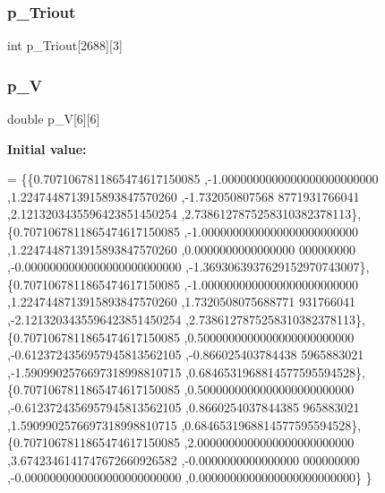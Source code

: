 \mbox{\label{a00449_a18cfd6f50be18d3cfbb0235076b8d729}} 
\subsubsection{\texorpdfstring{p\+\_\+\+Triout}{p\_Triout}}
{\footnotesize\ttfamily int p\+\_\+\+Triout\mbox{[}2688\mbox{]}\mbox{[}3\mbox{]}}

\mbox{\label{a00449_afe4548e68ef5e0d69ce742335c373bc2}} 
\subsubsection{\texorpdfstring{p\+\_\+V}{p\_V}}
{\footnotesize\ttfamily double p\+\_\+V\mbox{[}6\mbox{]}\mbox{[}6\mbox{]}}

{\bfseries Initial value\+:}
\begin{DoxyCode}
= \{\{0.7071067811865474617150085 ,-1.0000000000000000000000000 ,1.2247448713915893847570260 ,-1.732050807568
      8771931766041 ,2.1213203435596423851450254 ,2.7386127875258310382378113\},
\{0.7071067811865474617150085 ,-1.0000000000000000000000000 ,1.2247448713915893847570260 ,0.0000000000000000
      000000000 ,-0.0000000000000000000000000 ,-1.3693063937629152970743007\},
\{0.7071067811865474617150085 ,-1.0000000000000000000000000 ,1.2247448713915893847570260 ,1.7320508075688771
      931766041 ,-2.1213203435596423851450254 ,2.7386127875258310382378113\},
\{0.7071067811865474617150085 ,0.5000000000000000000000000 ,-0.6123724356957945813562105 ,-0.866025403784438
      5965883021 ,-1.5909902576697318998810715 ,0.6846531968814577595594528\},
\{0.7071067811865474617150085 ,0.5000000000000000000000000 ,-0.6123724356957945813562105 ,0.8660254037844385
      965883021 ,1.5909902576697318998810715 ,0.6846531968814577595594528\},
\{0.7071067811865474617150085 ,2.0000000000000000000000000 ,3.6742346141747672660926582 ,-0.0000000000000000
      000000000 ,-0.0000000000000000000000000 ,0.0000000000000000000000000\}
\}
\end{DoxyCode}
\mbox{\label{a00449_a00c3283795a9d9a77122c4fe663af0f9}} 
